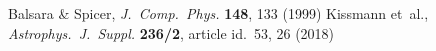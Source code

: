 
\begin{thebibliography}{50}

  Balsara \& Spicer, \textit{J.~Comp.~Phys.} {\bf 148}, 133 (1999)
  Kissmann et~al., \textit{Astrophys.~J.~Suppl.} \textbf{236/2},
  article id.~53, 26 (2018)
\end{thebibliography}